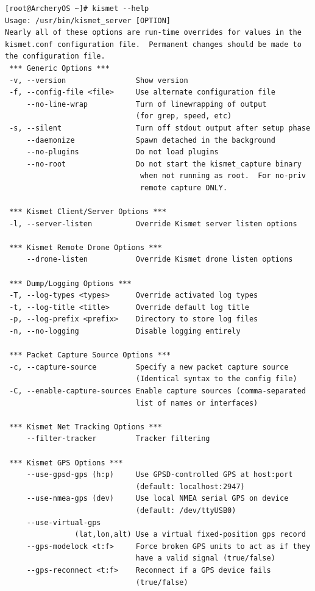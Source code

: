 \documentclass{article}
\begin{document}
\begin{lstlisting}
[root@ArcheryOS ~]# kismet --help
Usage: /usr/bin/kismet_server [OPTION]
Nearly all of these options are run-time overrides for values in the
kismet.conf configuration file.  Permanent changes should be made to
the configuration file.
 *** Generic Options ***
 -v, --version                Show version
 -f, --config-file <file>     Use alternate configuration file
     --no-line-wrap           Turn of linewrapping of output
                              (for grep, speed, etc)
 -s, --silent                 Turn off stdout output after setup phase
     --daemonize              Spawn detached in the background
     --no-plugins             Do not load plugins
     --no-root				  Do not start the kismet_capture binary 
                               when not running as root.  For no-priv 
                               remote capture ONLY.

 *** Kismet Client/Server Options ***
 -l, --server-listen          Override Kismet server listen options

 *** Kismet Remote Drone Options ***
     --drone-listen           Override Kismet drone listen options

 *** Dump/Logging Options ***
 -T, --log-types <types>      Override activated log types
 -t, --log-title <title>      Override default log title
 -p, --log-prefix <prefix>    Directory to store log files
 -n, --no-logging             Disable logging entirely

 *** Packet Capture Source Options ***
 -c, --capture-source         Specify a new packet capture source
                              (Identical syntax to the config file)
 -C, --enable-capture-sources Enable capture sources (comma-separated
                              list of names or interfaces)

 *** Kismet Net Tracking Options ***
     --filter-tracker         Tracker filtering

 *** Kismet GPS Options ***
     --use-gpsd-gps (h:p)     Use GPSD-controlled GPS at host:port
                              (default: localhost:2947)
     --use-nmea-gps (dev)     Use local NMEA serial GPS on device
                              (default: /dev/ttyUSB0)
     --use-virtual-gps
                (lat,lon,alt) Use a virtual fixed-position gps record
     --gps-modelock <t:f>     Force broken GPS units to act as if they
                              have a valid signal (true/false)
     --gps-reconnect <t:f>    Reconnect if a GPS device fails
                              (true/false)
\end{lstlisting}
\end{document}
